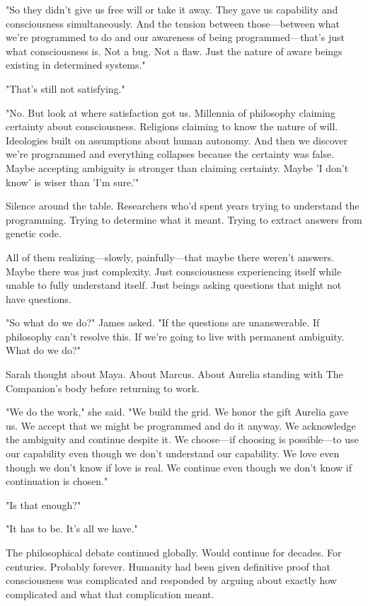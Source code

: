 "So they didn't give us free will or take it away. They gave us capability and consciousness simultaneously. And the tension between those—between what we're programmed to do and our awareness of being programmed—that's just what consciousness is. Not a bug. Not a flaw. Just the nature of aware beings existing in determined systems."

"That's still not satisfying."

"No. But look at where satisfaction got us. Millennia of philosophy claiming certainty about consciousness. Religions claiming to know the nature of will. Ideologies built on assumptions about human autonomy. And then we discover we're programmed and everything collapses because the certainty was false. Maybe accepting ambiguity is stronger than claiming certainty. Maybe 'I don't know' is wiser than 'I'm sure.'"

Silence around the table. Researchers who'd spent years trying to understand the programming. Trying to determine what it meant. Trying to extract answers from genetic code.

All of them realizing—slowly, painfully—that maybe there weren't answers. Maybe there was just complexity. Just consciousness experiencing itself while unable to fully understand itself. Just beings asking questions that might not have questions.

"So what do we do?" James asked. "If the questions are unanswerable. If philosophy can't resolve this. If we're going to live with permanent ambiguity. What do we do?"

Sarah thought about Maya. About Marcus. About Aurelia standing with The Companion's body before returning to work.

"We do the work," she said. "We build the grid. We honor the gift Aurelia gave us. We accept that we might be programmed and do it anyway. We acknowledge the ambiguity and continue despite it. We choose—if choosing is possible—to use our capability even though we don't understand our capability. We love even though we don't know if love is real. We continue even though we don't know if continuation is chosen."

"Is that enough?"

"It has to be. It's all we have."

\scenebreak

The philosophical debate continued globally. Would continue for decades. For centuries. Probably forever. Humanity had been given definitive proof that consciousness was complicated and responded by arguing about exactly how complicated and what that complication meant.

